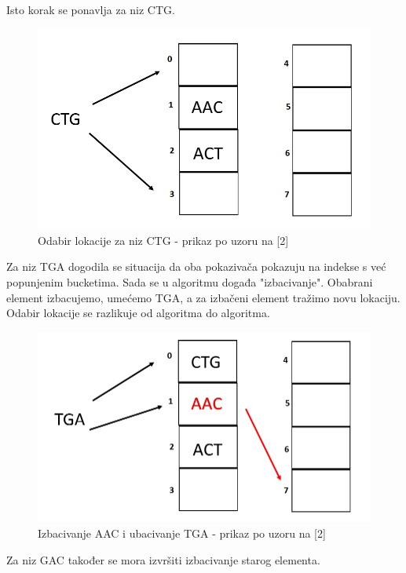 \documentclass[times, utf8, seminar, numeric]{fer}
\begin{document}
Isto korak se ponavlja za niz CTG.
\begin{figure}[H]
  \centering
  \setlength{\intextsep}{5pt}
  \includegraphics[scale = 0.4]{images/insertion3.png}
  \caption{Odabir lokacije za niz CTG - prikaz po uzoru na [2]}
  \label{fig_insert3}
\end{figure}

Za niz TGA dogodila se situacija da oba pokazivača pokazuju na indekse s već popunjenim bucketima. Sada se u algoritmu događa "izbacivanje". Obabrani element izbacujemo, umećemo TGA, a za izbačeni element tražimo novu lokaciju. Odabir lokacije se razlikuje od algoritma do algoritma.

\begin{figure}[H]
  \centering
  \setlength{\intextsep}{5pt}
  \includegraphics[scale = 0.4]{images/swap1.png}
  \caption{Izbacivanje AAC i ubacivanje TGA - prikaz po uzoru na [2]}
  \label{fig_swap1}
\end{figure}

Za niz GAC također se mora izvršiti izbacivanje starog elementa. 
\end{document}
